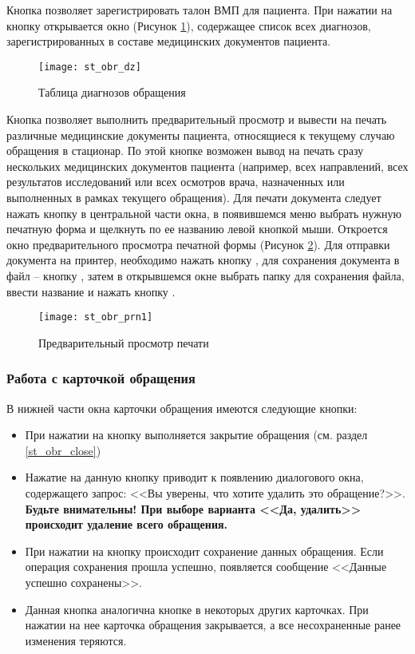 Кнопка   позволяет зарегистрировать талон ВМП для пациента. При нажатии на кнопку  открывается окно (Рисунок \ref{img_st_obr_dz}), содержащее список всех диагнозов, зарегистрированных в составе медицинских документов пациента.

\begin{figure}[ht!]\centering
   \texttt{[image: st\_obr\_dz]}
   \caption{Таблица диагнозов обращения}
   \label{img_st_obr_dz}
\end{figure}

Кнопка  позволяет выполнить предварительный просмотр и вывести на печать различные медицинские документы пациента, относящиеся  к текущему случаю обращения в стационар. По этой кнопке возможен вывод на печать сразу нескольких медицинских документов пациента (например, всех направлений, всех результатов исследований или всех осмотров врача, назначенных или выполненных в рамках текущего обращения). Для печати документа следует нажать кнопку  в центральной части окна, в появившемся меню выбрать нужную печатную форма и щелкнуть по ее названию левой кнопкой мыши. Откроется окно предварительного просмотра печатной формы (Рисунок \ref{img_st_obr_prn1}). Для отправки документа на принтер, необходимо нажать кнопку , для сохранения документа в файл – кнопку , затем в открывшемся окне выбрать папку для сохранения файла, ввести название и нажать кнопку .

\begin{figure}[ht]\centering
   \texttt{[image: st\_obr\_prn1]}
   \caption{Предварительный просмотр печати}
   \label{img_st_obr_prn1}
\end{figure}
 
\subsubsection{Работа с карточкой обращения}

В нижней части окна карточки обращения имеются следующие кнопки:
\begin{itemize}
 \item При нажатии на кнопку  выполняется закрытие обращения (см. раздел \ref{st_obr_close})
 \item {} Нажатие на данную кнопку приводит к появлению диалогового окна, содержащего запрос: <<Вы уверены, что хотите удалить это обращение?>>. \textbf{Будьте внимательны! При выборе варианта <<Да, удалить>> происходит удаление всего обращения.}
 \item {} При нажатии на кнопку происходит сохранение данных обращения. Если операция сохранения прошла успешно, появляется сообщение <<Данные успешно сохранены>>.
 \item {} Данная кнопка аналогична кнопке  в некоторых других карточках. При нажатии на нее карточка обращения закрывается, а все несохраненные ранее изменения теряются.
\end{itemize}

